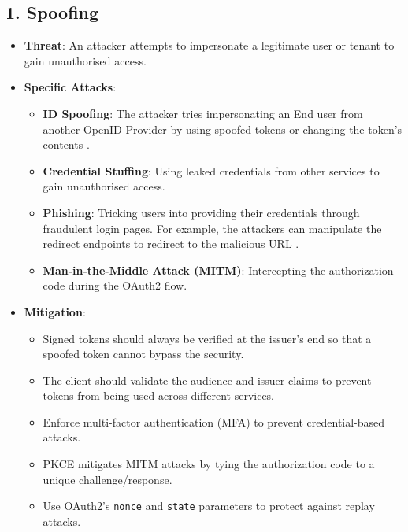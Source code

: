 \subsection*{1. Spoofing}
\begin{itemize}
    \item \textbf{Threat}: An attacker attempts to impersonate a legitimate user or tenant to gain unauthorised access.
    \item \textbf{Specific Attacks}:
    \begin{itemize}
        \item \textbf{ID Spoofing}: The attacker tries impersonating an End user from another OpenID Provider by using spoofed tokens or changing the token's contents \citep{oidc_attacks}.
        \item \textbf{Credential Stuffing}: Using leaked credentials from other services to gain unauthorised access.
        \item \textbf{Phishing}: Tricking users into providing their credentials through fraudulent login pages. For example, the attackers can manipulate the redirect endpoints to redirect to the malicious URL \citep{open_redirect_oidc_threat}.
        \item \textbf{Man-in-the-Middle Attack (MITM)}: Intercepting the authorization code during the OAuth2 flow.
    \end{itemize}
    \item \textbf{Mitigation}:
    \begin{itemize}
        \item Signed tokens should always be verified at the issuer's end so that a spoofed token cannot bypass the security.
        \item The client should validate the audience and issuer claims to prevent tokens from being used across different services.
        \item Enforce multi-factor authentication (MFA) to prevent credential-based attacks.
        \item PKCE mitigates MITM attacks by tying the authorization code to a unique challenge/response.
        \item Use OAuth2’s \texttt{nonce} and \texttt{state} parameters to protect against replay attacks.
    \end{itemize}
\end{itemize}

